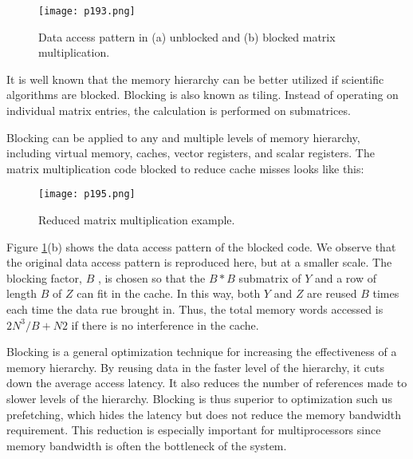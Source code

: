 \begin{figure}[H]
	\centering
	\texttt{[image: p193.png]}
	\caption{Data access pattern in (a) unblocked and (b) blocked matrix multiplication.}
	\label{fig:p193}
\end{figure}


It is well known that the memory hierarchy can be better 
utilized if scientific algorithms are blocked.
Blocking is also known as tiling. 
Instead of operating on individual matrix entries, 
the calculation is performed on submatrices.


Blocking can be applied to any and multiple levels of memory
hierarchy, including virtual memory, caches, vector registers, and
scalar registers. The matrix multiplication code
blocked to reduce cache misses looks like this:

\begin{figure}[H]
	\centering
	\texttt{[image: p195.png]}
	\caption{Reduced matrix multiplication example.}
	\label{fig:p195}
\end{figure}


Figure \ref{fig:p193}(b) shows the data access pattern of the 
blocked code. We
observe that the original data access pattern is reproduced here,
but at a smaller scale. The blocking factor, $B$ , is chosen so that
the $B * B$ submatrix of $Y$ and a row of length $B$ of $Z$ can fit in
the cache. In this way, both $Y$ and $Z$ are reused $B$ times each time
the data rue brought in. Thus, the total memory words accessed
is $2N^3/B + N2$ if there is no interference in the cache.

Blocking is a general optimization technique for increasing the
effectiveness of a memory hierarchy. By reusing data in the faster
level of the hierarchy, it cuts down the average access latency.
It also reduces the number of references made to slower levels
of the hierarchy. Blocking is thus superior to optimization such
us prefetching, which hides the latency but does not reduce the
memory bandwidth requirement. This reduction is especially important for multiprocessors since memory bandwidth is often the
bottleneck of the system.

